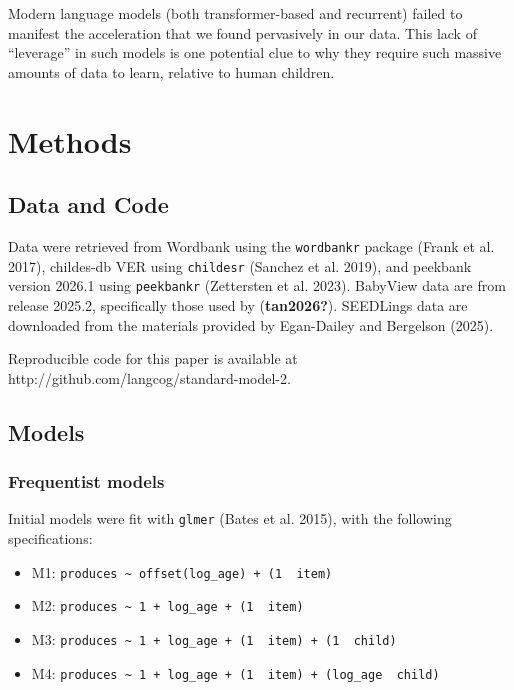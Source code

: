 \documentclass[
  11pt,
]{article}
\providecommand{\tightlist}{%
  \setlength{\itemsep}{0pt}\setlength{\parskip}{0pt}}
\begin{document}
Modern language models (both transformer-based and recurrent) failed to
manifest the acceleration that we found pervasively in our data. This
lack of ``leverage'' in such models is one potential clue to why they
require such massive amounts of data to learn, relative to human
children.

\section{Methods}\label{methods}

\subsection{Data and Code}\label{data-and-code}

Data were retrieved from Wordbank using the \texttt{wordbankr} package
(Frank et al. 2017), childes-db VER using \texttt{childesr} (Sanchez et
al. 2019), and peekbank version 2026.1 using \texttt{peekbankr}
(Zettersten et al. 2023). BabyView data are from release 2025.2,
specifically those used by (\textbf{tan2026?}). SEEDLings data are
downloaded from the materials provided by Egan-Dailey and Bergelson
(2025).

Reproducible code for this paper is available at
http://github.com/langcog/standard-model-2.

\subsection{Models}\label{models}

\subsubsection{Frequentist models}\label{frequentist-models}

Initial models were fit with \texttt{glmer} (Bates et al. 2015), with
the following specifications:

\begin{itemize}
\tightlist
\item
  M1:
  \texttt{produces\ \textasciitilde{}\ offset(log\_age)\ +\ (1\ \textbar{}\ item)}
\item
  M2:
  \texttt{produces\ \textasciitilde{}\ 1\ +\ log\_age\ +\ (1\ \textbar{}\ item)}
\item
  M3:
  \texttt{produces\ \textasciitilde{}\ 1\ +\ log\_age\ +\ (1\ \textbar{}\ item)\ +\ (1\ \textbar{}\ child)}
\item
  M4:
  \texttt{produces\ \textasciitilde{}\ 1\ +\ log\_age\ +\ (1\ \textbar{}\ item)\ +\ (log\_age\ \textbar{}\ child)}
\end{itemize}
\end{document}
